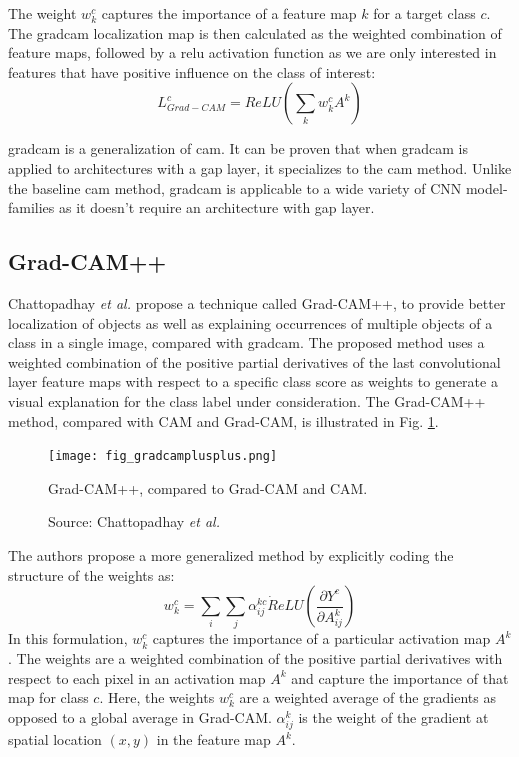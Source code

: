 The weight $w_{k}^{c}$ captures the importance of a feature map $k$ for a target class $c$. The \acrshort{gradcam} localization map is then calculated as the weighted combination of feature maps, followed by a \acrshort{relu} activation function as we are only interested in features that have positive influence on the class of interest:
\begin{equation}
    L_{Grad-CAM}^{c} = ReLU \left( \sum_{k}w_{k}^{c} A^{k} \right)
\end{equation}

\acrshort{gradcam} is a generalization of \acrshort{cam}. It can be proven that when \acrshort{gradcam} is applied to architectures with a \acrshort{gap} layer, it specializes to the \acrshort{cam} method. Unlike the baseline \acrshort{cam} method, \acrshort{gradcam} is applicable to a wide variety of CNN model-families as it doesn't require an architecture with \acrshort{gap} layer.

\subsection{Grad-CAM++}
Chattopadhay \textit{et al.} \cite{chattopadhay2018grad} propose a technique called Grad-CAM++, to provide better localization of objects
as well as explaining occurrences of multiple objects of a class in a single image, compared with \acrshort{gradcam}. The proposed method uses a weighted combination of the positive partial derivatives of the last convolutional layer feature maps with respect to a specific class score as weights to generate a visual explanation for the class label under consideration. The Grad-CAM++ method, compared with CAM and Grad-CAM, is illustrated in Fig. \ref{fig:gradcamplusplus}.

\begin{figure}[h]
    \begin{center}       
    \texttt{[image: fig\_gradcamplusplus.png]}
    \caption[Grad-CAM++]{Grad-CAM++, compared to Grad-CAM and CAM.}
    \caption*{Source: Chattopadhay \textit{et al.} \cite{chattopadhay2018grad}}
    \label{fig:gradcamplusplus}
    \end{center}
\end{figure}

The authors propose a more generalized method by explicitly coding the structure of the weights as:
\begin{equation}
    w_{k}^{c} = \sum_{i} \sum_{j} \alpha_{ij}^{kc} \dot ReLU \left( \frac{\partial{Y^c}}{\partial{A_{ij}^{k}}} \right)
\end{equation}
In this formulation, $w_{k}^{c}$ captures the importance of a particular activation map $A^k$. The weights are a weighted combination of the positive
partial derivatives with respect to each pixel in an activation map $A^k$ and capture the importance of that map for class $c$. Here, the weights $w_k^c$ are a weighted average of the gradients as opposed to a global average in Grad-CAM. $\alpha_{ij}^{k}$ is the weight of the gradient at spatial location $(x,y)$ in the feature map $A^k$. 

